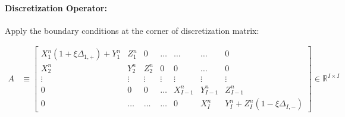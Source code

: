 \documentclass[11pt]{article}
\newcommand{\R}{\ensuremath{\mathbb{R}}}
\begin{document}

\paragraph{Discretization Operator:} Apply the boundary conditions at the corner of discretization matrix:

\begin{align}
		A &\equiv \begin{bmatrix}
	X_1^n(1+\xi\Delta_{1,+})+Y_1^n & Z_1^n & 0 & \ldots & \ldots & \ldots & 0\\
	X^n_2 & Y^n_2 & Z^n_2 & 0 & 0 & \ldots & 0\\
	\vdots & \vdots & \vdots & \vdots & \vdots & \vdots & \vdots\\		
	0 & 0 & 0 & \ldots & X^n_{I-1} & Y^n_{I-1} & Z^n_{I-1}\\
	0 & \ldots & \ldots & \ldots & 0 & X_I^n & Y_I^n+Z_I^n(1-\xi\Delta_{I,-})
\end{bmatrix}\in\R^{I\times I}\label{eq:A-n}
\end{align}
\end{document}
